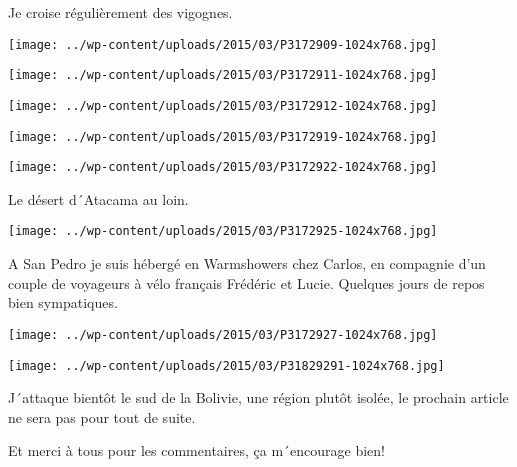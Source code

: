  Je croise régulièrement des vigognes.

\begin{center} \texttt{[image: ../wp-content/uploads/2015/03/P3172909-1024x768.jpg]} \end{center}



 

\begin{center} \texttt{[image: ../wp-content/uploads/2015/03/P3172911-1024x768.jpg]} \end{center}



 

\begin{center} \texttt{[image: ../wp-content/uploads/2015/03/P3172912-1024x768.jpg]} \end{center}



 

\begin{center} \texttt{[image: ../wp-content/uploads/2015/03/P3172919-1024x768.jpg]} \end{center}



 

\begin{center} \texttt{[image: ../wp-content/uploads/2015/03/P3172922-1024x768.jpg]} \end{center}

 

 Le désert d´Atacama au loin. 

 

\begin{center} \texttt{[image: ../wp-content/uploads/2015/03/P3172925-1024x768.jpg]} \end{center}

 

 A San Pedro je suis hébergé en Warmshowers chez Carlos, en compagnie d'un couple de voyageurs à vélo français Frédéric et Lucie. Quelques jours de repos bien sympatiques. 

 

\begin{center} \texttt{[image: ../wp-content/uploads/2015/03/P3172927-1024x768.jpg]} \end{center}



 

\begin{center} \texttt{[image: ../wp-content/uploads/2015/03/P31829291-1024x768.jpg]} \end{center}

J´attaque bientôt le sud de la Bolivie, une région plutôt isolée, le prochain article ne sera pas pour tout de suite.

 Et merci à tous pour les commentaires, ça m´encourage bien!

 


 
 
